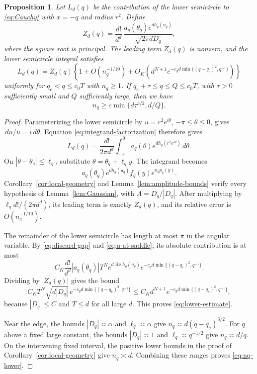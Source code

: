 \documentclass[11pt,reqno]{amsart}
\numberwithin{equation}{section}
\newtheorem{proposition}[theorem]{Proposition}
\renewcommand{\Re}{\operatorname{Re}}
\newcommand{\dd}{\,d}
\begin{document}
\begin{proposition}\label{prop:lower-contribution}
Let $L_d(q)$ be the contribution of the lower semicircle to
\eqref{eq:Cauchy} with $x=-q$ and radius $r^2$. Define
\begin{equation}\label{eq:Z-definition}
 Z_d(q)=\frac{d!}{d^d}\,
        \frac{a_q(\theta_q)e^{dh_q(u_q)}}{\sqrt{2\pi dD_q}},
\end{equation}
where the square root is principal. The leading term $Z_d(q)$ is
nonzero, and the lower semicircle integral satisfies
\begin{equation}\label{eq:lower-estimate}
 L_d(q)=Z_d(q)
 \left\{1+O(n_q^{-1/10})+
 O_K\!\left(d^{N+1}e^{-c_gd\min\{(q-q_e)^2,q^{-1}\}}\right)\right\}
\end{equation}
uniformly for $q_e<q\le c_0T$ with $n_q\ge1$.
If $q_e+\tau\le q\le Q\le c_0T$, with $\tau>0$ sufficiently small
and $Q$ sufficiently large, then we have
\begin{equation}\label{eq:nq-lower}
 n_q\ge c\min\{d\tau^{3/2},d/Q\}.
\end{equation}
\end{proposition}

\begin{proof}
Parameterizing the lower semicircle by $u=r^2e^{i\theta}$,
$-\pi\le\theta\le0$, gives $\dd u/u=i\dd\theta$.
Equation \eqref{eq:integrand-factorization} therefore gives
\[
 L_d(q)=\frac{d!}{2\pi d^d}
        \int_{-\pi}^0a_q(\theta)e^{dh_q(r^2e^{i\theta})}\dd\theta.
\]
On $|\theta-\theta_q|\le\ell_q$, substitute
$\theta=\theta_q+\ell_qy$. The integrand becomes
\[
 a_q(\theta_q)e^{dh_q(u_q)}f_q(y)e^{n_qp_q(y)}.
\]
Corollary~\ref{cor:local-geometry} and
Lemma~\ref{lem:amplitude-bounds} verify every hypothesis of
Lemma~\ref{lem:Gaussian}, with $A=D_q/|D_q|$.
After multiplying by $\ell_qd!/(2\pi d^d)$, its leading term is
exactly $Z_d(q)$, and its relative error is $O(n_q^{-1/10})$.

The remainder of the lower semicircle has length at most $\pi$ in
the angular variable. By \eqref{eq:discard-gap} and
\eqref{eq:a-at-saddle}, its absolute contribution is at most
\[
 C_K\frac{d!}{d^d}|a_q(\theta_q)|T^Ne^{d\Re h_q(u_q)}
             e^{-c_gd\min\{(q-q_e)^2,q^{-1}\}}.
\]
Dividing by $|Z_d(q)|$ gives the bound
\[
 C_KT^N\sqrt{d|D_q|}\,
        e^{-c_gd\min\{(q-q_e)^2,q^{-1}\}}
 \le C_Kd^{N+1}e^{-c_gd\min\{(q-q_e)^2,q^{-1}\}},
\]
because $|D_q|\le C$ and $T\le d$ for all large $d$.
This proves \eqref{eq:lower-estimate}.

Near the edge, the bounds $|D_q|\asymp\alpha$ and
$\ell_q\asymp\alpha$ give $n_q\asymp d(q-q_e)^{3/2}$.
For $q$ above a fixed large constant, the bounds $|D_q|\asymp1$
and $\ell_q\asymp q^{-1/2}$ give $n_q\asymp d/q$.
On the intervening fixed interval, the positive lower bounds in
the proof of Corollary~\ref{cor:local-geometry} give $n_q\asymp d$.
Combining these ranges proves \eqref{eq:nq-lower}.
\end{proof}
\end{document}
